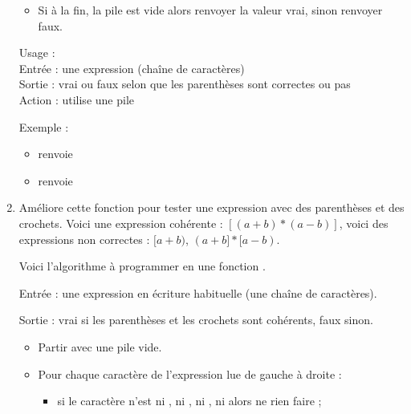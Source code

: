 \documentclass[11pt,class=report,crop=false]{standalone}
\begin{document}
\begin{activite}
\begin{enumerate}
\begin{algorithme}
\begin{itemize}
   \item Si à la fin, la pile est vide alors renvoyer la valeur \og{}vrai\fg{}, sinon renvoyer \og{}faux\fg{}.
   
 \end{itemize}  
   \end{algorithme}


\begin{fonction}
  Usage :  \\
  Entrée : une expression (chaîne de caractères) \\
  Sortie : vrai ou faux selon que les parenthèses sont correctes ou pas\\
  Action : utilise une pile
   
  \medskip
   
  Exemple : 
  \begin{itemize}
    \item {} renvoie 
    \item {} renvoie 
    \end{itemize}    
\end{fonction}  
  
  
\item Améliore cette fonction pour tester une expression avec des parenthèses et des crochets.
Voici une expression cohérente : $[(a+b)*(a-b)]$, voici des expressions non correctes :
$[a+b)$, $(a+b]*[a-b)$.

Voici l'algorithme à programmer en une fonction .


  \begin{algorithme}
  Entrée : une expression en écriture habituelle (une chaîne de caractères).

  Sortie : \og{}vrai\fg{} si les parenthèses et les crochets sont cohérents, \og{}faux\fg{} sinon.     

  \begin{itemize}

  \item Partir avec une pile vide.   
   
   \item Pour chaque caractère de l'expression lue de gauche à droite :
   \begin{itemize}
     \item si le caractère n'est ni , ni , ni \ci{"["}, ni \ci{"]"} alors ne rien faire ;
     

\end{itemize}
\end{itemize}
\end{algorithme}
\end{enumerate}
\end{activite}
\end{document}
